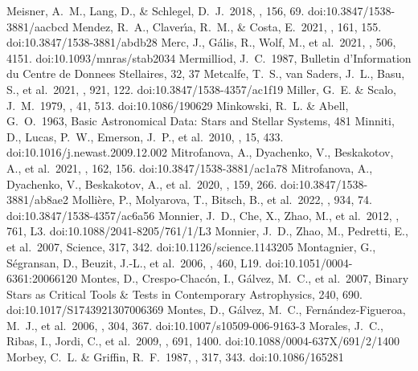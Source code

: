 \documentclass[twocolumn,tighten,twocolappendix]{aastex631}
\begin{document}
\begin{thebibliography}{}
 Meisner, A.~M., Lang, D., \& Schlegel, D.~J.\ 2018, \aj, 156, 69. doi:10.3847/1538-3881/aacbcd
 Mendez, R.~A., Claver{\'\i}a, R.~M., \& Costa, E.\ 2021, \aj, 161, 155. doi:10.3847/1538-3881/abdb28
 Merc, J., G{\'a}lis, R., Wolf, M., et al.\ 2021, \mnras, 506, 4151. doi:10.1093/mnras/stab2034
 Mermilliod, J.~C.\ 1987, Bulletin d'Information du Centre de Donnees Stellaires, 32, 37
 Metcalfe, T.~S., van Saders, J.~L., Basu, S., et al.\ 2021, \apj, 921, 122. doi:10.3847/1538-4357/ac1f19
 Miller, G.~E. \& Scalo, J.~M.\ 1979, \apjs, 41, 513. doi:10.1086/190629
 Minkowski, R.~L. \& Abell, G.~O.\ 1963, Basic Astronomical Data: Stars and Stellar Systems, 481
 Minniti, D., Lucas, P.~W., Emerson, J.~P., et al.\ 2010, \na, 15, 433. doi:10.1016/j.newast.2009.12.002
 Mitrofanova, A., Dyachenko, V., Beskakotov, A., et al.\ 2021, \aj, 162, 156. doi:10.3847/1538-3881/ac1a78
 Mitrofanova, A., Dyachenko, V., Beskakotov, A., et al.\ 2020, \aj, 159, 266. doi:10.3847/1538-3881/ab8ae2
 Molli{\`e}re, P., Molyarova, T., Bitsch, B., et al.\ 2022, \apj, 934, 74. doi:10.3847/1538-4357/ac6a56
 Monnier, J.~D., Che, X., Zhao, M., et al.\ 2012, \apjl, 761, L3. doi:10.1088/2041-8205/761/1/L3
 Monnier, J.~D., Zhao, M., Pedretti, E., et al.\ 2007, Science, 317, 342. doi:10.1126/science.1143205
 Montagnier, G., S{\'e}gransan, D., Beuzit, J.-L., et al.\ 2006, \aap, 460, L19. doi:10.1051/0004-6361:20066120
 Montes, D., Crespo-Chac{\'o}n, I., G{\'a}lvez, M.~C., et al.\ 2007, Binary Stars as Critical Tools \& Tests in Contemporary Astrophysics, 240, 690. doi:10.1017/S1743921307006369
 Montes, D., G{\'a}lvez, M.~C., Fern{\'a}ndez-Figueroa, M.~J., et al.\ 2006, \apss, 304, 367. doi:10.1007/s10509-006-9163-3
 Morales, J.~C., Ribas, I., Jordi, C., et al.\ 2009, \apj, 691, 1400. doi:10.1088/0004-637X/691/2/1400
 Morbey, C.~L. \& Griffin, R.~F.\ 1987, \apj, 317, 343. doi:10.1086/165281

\end{thebibliography}
\end{document}
